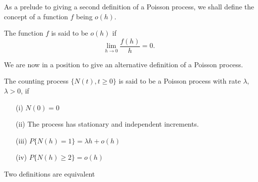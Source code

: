 \documentclass[lang=cn,10pt,thmcnt=section]{elegantbook}
\begin{document}
As a prelude to giving a second definition of a Poisson process, we shall define the concept of a function \(f\) being \(o(h)\).
\begin{definition}
	The function \(f\) is said to be \(o(h)\) if
\[
\lim_{h \to 0} \frac{f(h)}{h} = 0.
\]
\end{definition}

We are now in a position to give an alternative definition of a Poisson process.

\begin{definition}
	The counting process $\{N(t), t \geq 0\}$ is said to be a Poisson process with rate $\lambda$, $\lambda > 0$, if
\begin{itemize}
    \item[(i)] $N(0) = 0$
    \item[(ii)] The process has stationary and independent increments.
    \item[(iii)] $P\{N(h) = 1\} = \lambda h + o(h)$
    \item[(iv)] $P\{N(h) \geq 2\} = o(h)$
\end{itemize}
\end{definition}
\begin{theorem}
	Two definitions are equivalent
\end{theorem}
\end{document}
